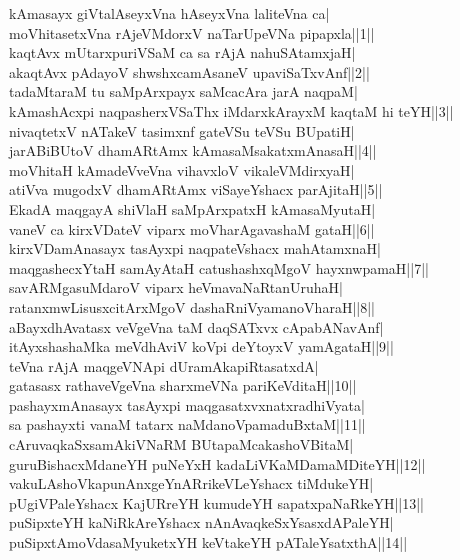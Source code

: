 \documentclass{article}
\begin{document}
kAmasayx giVtalAseyxVna hAseyxVna laliteVna ca|\\
moVhitasetxVna rAjeVMdorxV naTarUpeVNa pipapxla||1||\\
kaqtAvx mUtarxpuriVSaM ca sa rAjA nahuSAtamxjaH|\\
akaqtAvx pAdayoV shwshxcamAsaneV upaviSaTxvAnf||2||\\
tadaMtaraM tu saMpArxpayx saMcacAra jarA naqpaM|\\
kAmashAcxpi naqpasherxVSaThx iMdarxkArayxM kaqtaM hi teYH||3||\\
nivaqtetxV nATakeV tasimxnf gateVSu teVSu BUpatiH|\\
jarABiBUtoV dhamARtAmx kAmasaMsakatxmAnasaH||4||\\
moVhitaH kAmadeVveVna vihavxloV vikaleVMdirxyaH|\\
atiVva mugodxV dhamARtAmx viSayeYshacx parAjitaH||5||\\
EkadA maqgayA shiVlaH saMpArxpatxH kAmasaMyutaH|\\
vaneV ca kirxVDateV viparx moVharAgavashaM gataH||6||\\
kirxVDamAnasayx tasAyxpi naqpateVshacx mahAtamxnaH|\\
maqgashecxYtaH samAyAtaH catushashxqMgoV hayxnwpamaH||7||\\
savARMgasuMdaroV viparx heVmavaNaRtanUruhaH|\\
ratanxmwLisusxcitArxMgoV dashaRniVyamanoVharaH||8||\\
aBayxdhAvatasx veVgeVna taM daqSATxvx cApabANavAnf|\\
itAyxshashaMka meVdhAviV koVpi deYtoyxV yamAgataH||9||\\
teVna rAjA maqgeVNApi dUramAkapiRtasatxdA|\\
gatasasx rathaveVgeVna sharxmeVNa pariKeVditaH||10||\\
pashayxmAnasayx tasAyxpi maqgasatxvxnatxradhiVyata|\\
sa pashayxti vanaM tatarx naMdanoVpamaduBxtaM||11||\\
cAruvaqkaSxsamAkiVNaRM BUtapaMcakashoVBitaM|\\
guruBishacxMdaneYH puNeYxH kadaLiVKaMDamaMDiteYH||12||\\
vakuLAshoVkapunAnxgeYnARrikeVLeYshacx tiMdukeYH|\\
pUgiVPaleYshacx KajURreYH kumudeYH sapatxpaNaRkeYH||13||\\
puSipxteYH kaNiRkAreYshacx nAnAvaqkeSxYsasxdAPaleYH|\\
puSipxtAmoVdasaMyuketxYH keVtakeYH pATaleYsatxthA||14||\\
\end{document}
